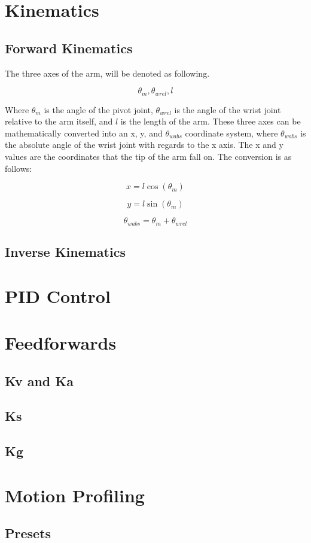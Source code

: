 \documentclass{scrartcl}
\begin{document}
\section{Kinematics}
\subsection{Forward Kinematics}
The three axes of the arm, will be denoted as following. 

\begin{equation} \label{Notation}
    \theta_m,
    \theta_{wrel},
    l
\end{equation}

Where \(\theta_m\) is the angle of the pivot joint, \(\theta_{wrel}\) is the angle of the wrist joint relative to the arm itself, and \(l\) is the length of the arm. These three axes can be mathematically converted into an x, y, and \(\theta_{wabs}\) coordinate system, where \(\theta_{wabs}\) is the absolute angle of the wrist joint with regards to the x axis. The x and y values are the coordinates that the tip of the arm fall on. The conversion is as follows: 

\begin{equation} \label{X Coordinate}
    x = l \cos(\theta_m)
\end{equation}

\begin{equation} \label{Y Coordinate}
    y = l \sin(\theta_m)
\end{equation}

\begin{equation} \label{Pivot Absolute Coordinate}
    \theta_{wabs} = \theta_m + \theta_{wrel}
\end{equation}

\subsection{Inverse Kinematics}

\section{PID Control}

\section{Feedforwards}
\subsection{Kv and Ka}
\subsection{Ks}
\subsection{Kg}

\section{Motion Profiling}

\subsection{Presets}
\end{document}
